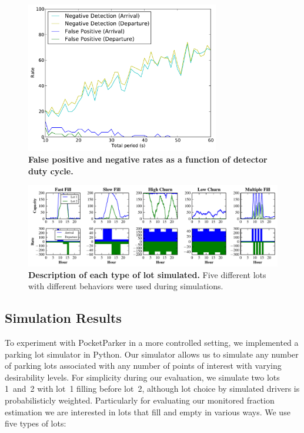 \begin{figure}
\centering
\includegraphics[width=3.325in]{./figures/Rate_FP_and_ND.pdf}

\caption{\textbf{False positive and negative rates as a function of detector
duty cycle.}} 

\label{fig-falsepositives}
\end{figure}

\begin{figure}
\centering
\includegraphics[width=\textwidth]{./simulator/figures/lots.pdf}

\caption{\textbf{Description of each type of lot simulated.} Five different
lots with different behaviors were used during simulations.}

\label{fig-lotsdescription}
\end{figure}

\subsection{Simulation Results}
\label{subsec-simulator}

To experiment with PocketParker in a more controlled setting, we implemented
a parking lot simulator in Python. Our simulator allows us to simulate any
number of parking lots associated with any number of points of interest with
varying desirability levels. For simplicity during our evaluation, we
simulate two lots 1~and~2 with lot~1 filling before lot~2, although lot
choice by simulated drivers is probabilisticly weighted. Particularly for
evaluating our monitored fraction estimation we are interested in lots that
fill and empty in various ways. We use five types of lots:

